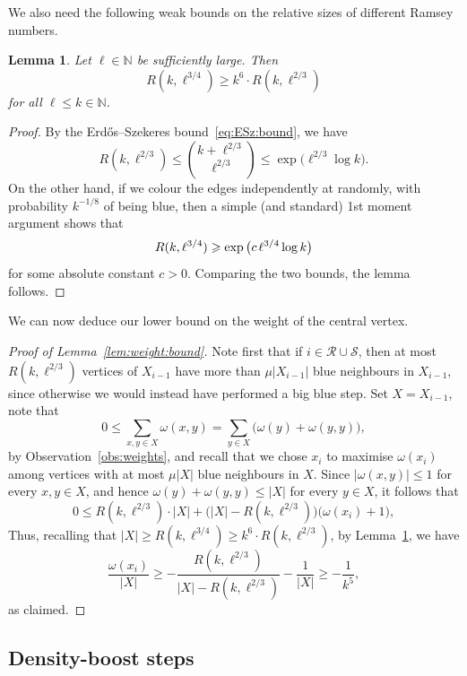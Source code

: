 \documentclass[12pt,reqno]{amsart}
\newtheorem{lemma}[theorem]{Lemma}
\theoremstyle{definition}
\theoremstyle{remark}
\newcommand\N{\mathbb{N}}
\def\cS{\mathcal{S}}
\renewcommand{\le}{\leqslant}
\renewcommand{\ge}{\geqslant}
\def\N{\mathbb{N}}
\def\cR{\mathcal{R}}
\begin{document}
We also need the following weak bounds on the relative sizes of different Ramsey numbers.

\begin{lemma}\label{lem:simple:Ramsey:ratio}
Let $\ell \in \N$ be sufficiently large. Then
$$R(k,\ell^{3/4}) \ge k^6 \cdot R(k,\ell^{2/3})$$
for all $\ell \le k \in \N$.
\end{lemma} 

\begin{proof}
By the Erd\H{o}s--Szekeres bound~\eqref{eq:ESz:bound}, we have
$$R(k,\ell^{2/3}) \le {k + \ell^{2/3} \choose \ell^{2/3}} \le \exp\big( \ell^{2/3} \log k \big).$$
On the other hand, if we colour the edges independently at randomly, with probability $k^{-1/8}$ of being blue, then a simple (and standard) 1st moment argument shows that 
$$R(k,\ell^{3/4}) \ge \exp\big( c \hspace{0.05cm} \ell^{3/4} \log k \big)$$
for some absolute constant $c > 0$. Comparing the two bounds, the lemma follows. %
\end{proof}

\pagebreak

We can now deduce our lower bound on the weight of the central vertex.

\begin{proof}[Proof of Lemma~\ref{lem:weight:bound}]
Note first that if $i \in \cR \cup \cS$, then at most $R(k,\ell^{2/3})$ vertices of $X_{i-1}$ have more than $\mu |X_{i-1}|$ blue neighbours in $X_{i-1}$, since otherwise we would instead have performed a big blue step. Set $X = X_{i-1}$, note that
$$0 \le \sum_{x,y \in X} \omega(x,y) = \sum_{y \in X} \big( \omega(y) + \omega(y,y) \big),$$
by Observation~\ref{obs:weights}, and recall that we chose $x_i$ to maximise $\omega(x_i)$ among vertices with at most $\mu |X|$ blue neighbours in $X$. Since $|\omega(x,y)| \le 1$ for every $x,y \in X$, and hence $\omega(y) + \omega(y,y) \le |X|$ for every $y \in X$, it follows that 
$$0 \le R(k,\ell^{2/3}) \cdot |X| + \big( |X| - R(k,\ell^{2/3}) \big) \big( \omega(x_i) + 1 \big),$$
Thus, recalling that $|X| \ge R(k,\ell^{3/4}) \ge k^6 \cdot R(k,\ell^{2/3})$, by Lemma~\ref{lem:simple:Ramsey:ratio}, we have 
$$\frac{\omega(x_i)}{|X|} \ge - \frac{R(k,\ell^{2/3})}{|X| - R(k,\ell^{2/3})} - \frac{1}{|X|} \ge - \frac{1}{k^5},$$
as claimed. 
\end{proof}


\subsection{Density-boost steps}
\end{document}
